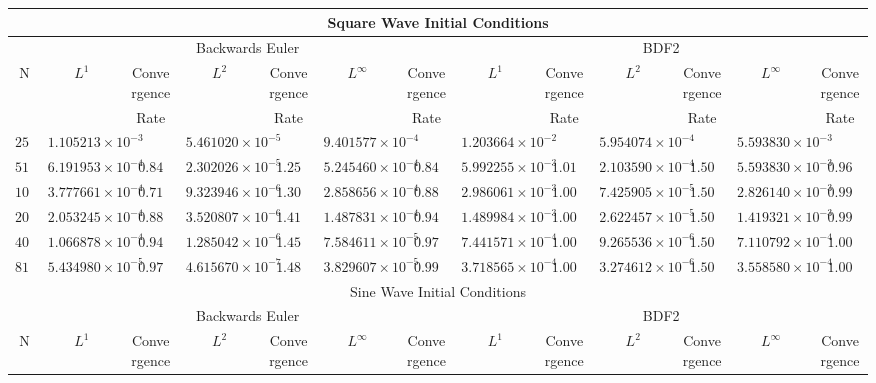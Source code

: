 \documentclass{article}
\begin{document}
  \thispagestyle{empty}
  \begin{tabular}[]{|c||c|c|c|c|c|c||c|c|c|c|c|c|}
    \hline
    \multicolumn{13}{|c|}{Square Wave Initial Conditions} \\
    \hline
    &\multicolumn{6}{c||}{Backwards Euler}&\multicolumn{6}{c|}{BDF2} \\
    \hline
    N&$L^{1}$&Convergence&$L^{2}$&Convergence&$L^{\infty}$&Convergence
     &$L^{1}$&Convergence&$L^{2}$&Convergence&$L^{\infty}$&Convergence \\
    &&Rate&&Rate&&Rate&&Rate&&Rate&&Rate \\
    \hline
    $256$&$1.105213\times{10}^{-3}$&&$5.461020\times{10}^{-5}$&&$9.401577\times{10}^{-4}$&
         &$1.203664\times{10}^{-2}$&&$5.954074\times{10}^{-4}$&&$5.593830\times{10}^{-3}$& \\
    \hline
    $512$&$6.191953\times{10}^{-4}$&$0.84$&$2.302026\times{10}^{-5}$&$1.25$&$5.245460\times{10}^{-4}$&$0.84$
         &$5.992255\times{10}^{-3}$&$1.01$&$2.103590\times{10}^{-4}$&$1.50$&$5.593830\times{10}^{-3}$&$0.96$ \\
    \hline
    $1024$&$3.777661\times{10}^{-4}$&$0.71$&$9.323946\times{10}^{-6}$&$1.30$&$2.858656\times{10}^{-4}$&$0.88$
          &$2.986061\times{10}^{-3}$&$1.00$&$7.425905\times{10}^{-5}$&$1.50$&$2.826140\times{10}^{-3}$&$0.99$ \\
    \hline
    $2048$&$2.053245\times{10}^{-4}$&$0.88$&$3.520807\times{10}^{-6}$&$1.41$&$1.487831\times{10}^{-4}$&$0.94$
          &$1.489984\times{10}^{-3}$&$1.00$&$2.622457\times{10}^{-5}$&$1.50$&$1.419321\times{10}^{-3}$&$0.99$ \\
    \hline
    $4096$&$1.066878\times{10}^{-4}$&$0.94$&$1.285042\times{10}^{-6}$&$1.45$&$7.584611\times{10}^{-5}$&$0.97$
          &$7.441571\times{10}^{-4}$&$1.00$&$9.265536\times{10}^{-6}$&$1.50$&$7.110792\times{10}^{-4}$&$1.00$ \\
    \hline
    $8192$&$5.434980\times{10}^{-5}$&$0.97$&$4.615670\times{10}^{-7}$&$1.48$&$3.829607\times{10}^{-5}$&$0.99$
          &$3.718565\times{10}^{-4}$&$1.00$&$3.274612\times{10}^{-6}$&$1.50$&$3.558580\times{10}^{-4}$&$1.00$ \\
    \hline
    \multicolumn{13}{|c|}{Sine Wave Initial Conditions} \\
    \hline
    &\multicolumn{6}{c||}{Backwards Euler}&\multicolumn{6}{c|}{BDF2} \\
    \hline
    N&$L^{1}$&Convergence&$L^{2}$&Convergence&$L^{\infty}$&Convergence
     &$L^{1}$&Convergence&$L^{2}$&Convergence&$L^{\infty}$&Convergence \\

\end{tabular}
\end{document}
